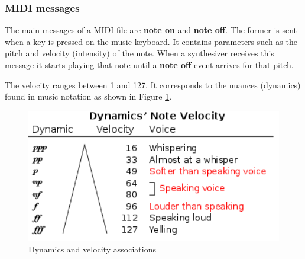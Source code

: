 \subsubsection{MIDI messages}
The main messages of a MIDI file are \textbf{note on} and \textbf{note off}. The former is sent when a key is pressed on the music keyboard. It contains parameters such as the pitch and velocity (intensity) of the note. When a synthesizer receives this message it starts playing that note until a \textbf{note off} event arrives for that pitch.

\par
The velocity ranges between 1 and 127. It corresponds to the nuances (dynamics) found in music notation as shown in Figure \ref{fig:midi_velocity}.

\begin{figure}[H]
	\caption[Dynamics and velocity associations]{Dynamics and velocity associations \cite{midi_dynamics}}
	\centering
	\label{fig:midi_velocity}
	\includegraphics[width=1\textwidth, height=0.9\textheight, keepaspectratio]{"resources/note_velocity"}
\end{figure}